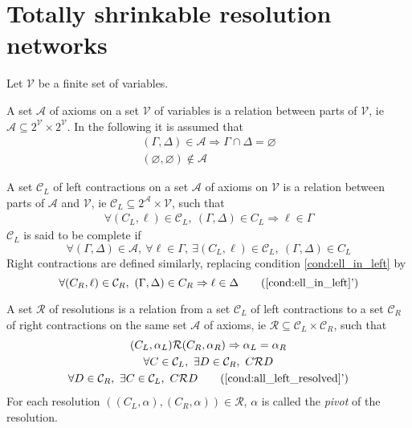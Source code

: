 \documentclass{article}
\newcommand{\parts}[1]{2^{#1}}
\newcommand{\varSet}{\mathcal{V}}
\newcommand{\axiomSet}{\mathcal{A}}
\newcommand{\conSet}{\mathcal{C}}
\newcommand{\resoSet}{\mathcal{R}}
\begin{document}
\section{Totally shrinkable resolution networks}

Let $\varSet$ be a finite set of variables.

A set $\axiomSet$ of axioms on a set $\varSet$ of variables is a relation between parts of $\varSet$,
ie $\axiomSet \subseteq \parts{\varSet} \times \parts{\varSet}$. In the following it is assumed that
\begin{gather}
  \left(\Gamma, \Delta \right) \in \axiomSet \Rightarrow \Gamma \cap \Delta = \varnothing \\
  (\varnothing, \varnothing) \notin \axiomSet
\end{gather}

A set $\conSet_L$ of left contractions on a set $\axiomSet$ of axioms on $\varSet$ is a relation
between parts of $\axiomSet$ and $\varSet$, ie $\conSet_L \subseteq \parts{\axiomSet} \times
\varSet$, such that
\begin{gather}
  \forall (C_L,\ell) \in \conSet_L ,~ (\Gamma, \Delta) \in C_L \Rightarrow \ell \in \Gamma
    \label{cond:ell_in_left} %
\end{gather}
$\conSet_L$ is said to be complete if
\begin{equation}
  \forall (\Gamma, \Delta) \in \axiomSet ,~ \forall \ell \in \Gamma ,~
    \exists (C_L, \ell) \in \conSet_L ,~ (\Gamma, \Delta) \in C_L
\end{equation}
Right contractions are defined similarly, replacing condition \eqref{cond:ell_in_left} by
\begin{equation}
  \forall (C_R,\ell) \in \conSet_R ,~ (\Gamma, \Delta) \in C_R \Rightarrow \ell \in \Delta
\tag{\ref{cond:ell_in_left}'}
\end{equation}

A set $\resoSet$ of resolutions is a relation from a set $\conSet_L$ of left contractions to a set
$\conSet_R$ of right contractions on the same set $\axiomSet$ of axioms, ie $\resoSet \subseteq
\conSet_L \times \conSet_R$, such that
\begin{gather}
  (C_L, \alpha_L) \resoSet (C_R, \alpha_R) \Rightarrow \alpha_L = \alpha_R \\
  \forall C \in \conSet_L ,~ \exists D \in \conSet_R ,~ C \resoSet D
    \label{cond:all_left_resolved} \\
  \forall D \in \conSet_R ,~ \exists C \in \conSet_L ,~ C \resoSet D
    \tag{\ref{cond:all_left_resolved}'}
\end{gather}
For each resolution $((C_L,\alpha),(C_R,\alpha)) \in \resoSet$, $\alpha$ is called the \emph{pivot}
of the resolution.
\end{document}
